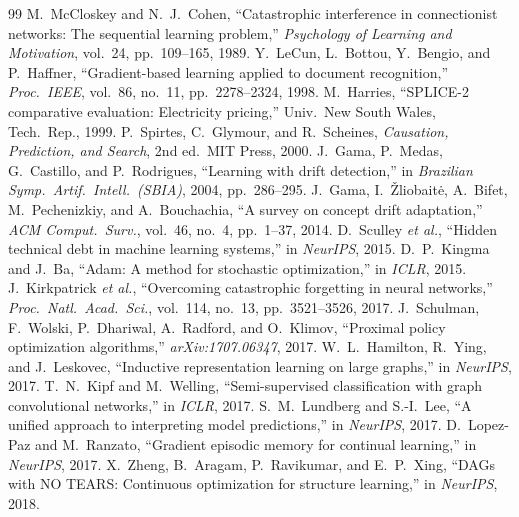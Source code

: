 \documentclass[conference]{IEEEtran}
\begin{document}
\begin{thebibliography}{99}
 M.\ McCloskey and N.\ J.\ Cohen, ``Catastrophic interference in connectionist networks: The sequential learning problem,'' \emph{Psychology of Learning and Motivation}, vol.\ 24, pp.\ 109--165, 1989.
 Y.\ LeCun, L.\ Bottou, Y.\ Bengio, and P.\ Haffner, ``Gradient-based learning applied to document recognition,'' \emph{Proc.\ IEEE}, vol.\ 86, no.\ 11, pp.\ 2278--2324, 1998.
 M.\ Harries, ``SPLICE-2 comparative evaluation: Electricity pricing,'' Univ.\ New South Wales, Tech.\ Rep., 1999.
 P.\ Spirtes, C.\ Glymour, and R.\ Scheines, \emph{Causation, Prediction, and Search}, 2nd ed.\ MIT Press, 2000.
 J.\ Gama, P.\ Medas, G.\ Castillo, and P.\ Rodrigues, ``Learning with drift detection,'' in \emph{Brazilian Symp.\ Artif.\ Intell.\ (SBIA)}, 2004, pp.\ 286--295.
 J.\ Gama, I.\ \v{Z}liobait\.{e}, A.\ Bifet, M.\ Pechenizkiy, and A.\ Bouchachia, ``A survey on concept drift adaptation,'' \emph{ACM Comput.\ Surv.}, vol.\ 46, no.\ 4, pp.\ 1--37, 2014.
 D.\ Sculley \emph{et al.}, ``Hidden technical debt in machine learning systems,'' in \emph{NeurIPS}, 2015.
 D.\ P.\ Kingma and J.\ Ba, ``Adam: A method for stochastic optimization,'' in \emph{ICLR}, 2015.
 J.\ Kirkpatrick \emph{et al.}, ``Overcoming catastrophic forgetting in neural networks,'' \emph{Proc.\ Natl.\ Acad.\ Sci.}, vol.\ 114, no.\ 13, pp.\ 3521--3526, 2017.
 J.\ Schulman, F.\ Wolski, P.\ Dhariwal, A.\ Radford, and O.\ Klimov, ``Proximal policy optimization algorithms,'' \emph{arXiv:1707.06347}, 2017.
 W.\ L.\ Hamilton, R.\ Ying, and J.\ Leskovec, ``Inductive representation learning on large graphs,'' in \emph{NeurIPS}, 2017.
 T.\ N.\ Kipf and M.\ Welling, ``Semi-supervised classification with graph convolutional networks,'' in \emph{ICLR}, 2017.
 S.\ M.\ Lundberg and S.-I.\ Lee, ``A unified approach to interpreting model predictions,'' in \emph{NeurIPS}, 2017.
 D.\ Lopez-Paz and M.\ Ranzato, ``Gradient episodic memory for continual learning,'' in \emph{NeurIPS}, 2017.
 X.\ Zheng, B.\ Aragam, P.\ Ravikumar, and E.\ P.\ Xing, ``DAGs with NO TEARS: Continuous optimization for structure learning,'' in \emph{NeurIPS}, 2018.

\end{thebibliography}
\end{document}

